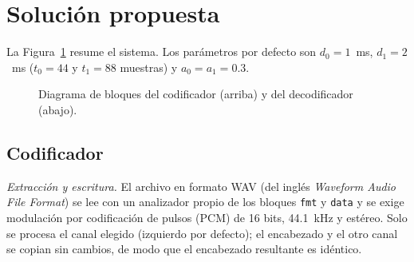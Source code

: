 \documentclass[journal]{IEEEtran}
\begin{document}
\section{Solución propuesta}
La Figura~\ref{fig:bloques} resume el sistema. Los parámetros por defecto son $d_0=1$~ms, $d_1=2$~ms ($t_0=44$ y $t_1=88$ muestras) y $a_0=a_1=0.3$.

\begin{figure}[t]
\centering
{}
\caption{Diagrama de bloques del codificador (arriba) y del decodificador (abajo).}
\label{fig:bloques}
\end{figure}

\subsection{Codificador}
\textit{Extracción y escritura.} El archivo en formato WAV (del inglés \textit{Waveform Audio File Format}) se lee con un analizador propio de los bloques \texttt{fmt} y \texttt{data} y se exige modulación por codificación de pulsos (PCM) de 16 bits, 44.1~kHz y estéreo. Solo se procesa el canal elegido (izquierdo por defecto); el encabezado y el otro canal se copian sin cambios, de modo que el encabezado resultante es idéntico.
\end{document}
